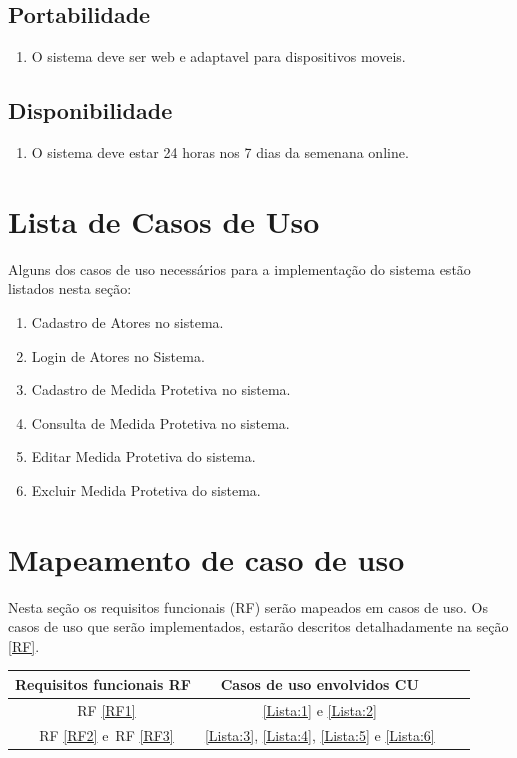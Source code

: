 \documentclass[
	12pt,				%
    oneside,			%
	a4paper,			%
	english,			%
	french,				%
	spanish,			%
	brazil,				%
	]{abntex2}
\begin{document}
		\subsection{Portabilidade}\label{sec:RFN03}
			\begin{enumerate}
				\item O sistema deve ser web e adaptavel para dispositivos moveis.
			\end{enumerate}
		\subsection{Disponibilidade}\label{sec:RFN04}
			\begin{enumerate}
				\item O sistema deve estar 24 horas nos 7 dias da semenana online.
			\end{enumerate}
	\section{Lista de Casos de Uso}
		Alguns dos casos de uso necessários para a implementação do sistema estão listados nesta seção:
		\begin{enumerate}
			\item Cadastro de Atores no sistema. \label{Lista:1}
			\item Login de Atores no Sistema.\label{Lista:2}
			\item Cadastro de Medida Protetiva no sistema.\label{Lista:3}
			\item Consulta de Medida Protetiva no sistema.\label{Lista:4}
			\item Editar Medida Protetiva do sistema.\label{Lista:5}
			\item Excluir Medida Protetiva do sistema.\label{Lista:6}
		\end{enumerate}
	\section{Mapeamento de caso de uso}
		 Nesta seção os requisitos funcionais (RF) serão mapeados em casos de uso. Os casos de uso que serão implementados, estarão descritos detalhadamente na seção \ref{RF}.

		\begin{center}
			\begin{tabular}{ |c|c|c|c| } 
				\hline
				Requisitos funcionais
				RF  & Casos de uso envolvidos
				CU \\
				\hline
				~RF \ref{RF1} & \ref{Lista:1} e \ref{Lista:2} \\ 
				\hline
				~RF \ref{RF2}  e~RF  \ref{RF3} & \ref{Lista:3}, \ref{Lista:4}, \ref{Lista:5} e \ref{Lista:6}   \\ 
				\hline
			
			\end{tabular}
		\end{center}
	
\end{document}
